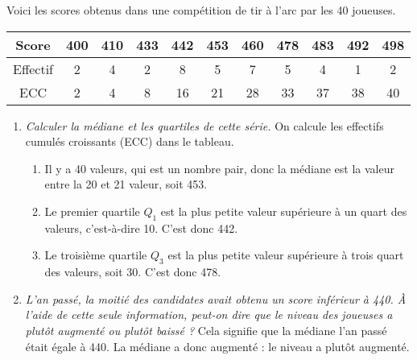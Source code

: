 \documentclass[12pt]{article}
\begin{document}
\begin{exercice}[Compétition]
  Voici les scores obtenus dans une compétition de tir à l'arc par
  les 40 joueuses.

  \begin{tabular}{c||c|c|c|c|c|c|c|c|c|c}
    Score
    & 400
    & 410
    & 433
    & 442
    & 453
    & 460
    & 478
    & 483
    & 492
    & 498
    \\
    \hline
    Effectif
    & 2
    & 4
    & 2
    & 8
    & 5
    & 7
    & 5
    & 4
    & 1
    & 2
    \\
    \hline
    ECC
    & 2
    & 4
    & 8
    & 16
    & 21
    & 28
    & 33
    & 37
    & 38
    & 40
  \end{tabular}

  \begin{enumerate}
    \item \emph{Calculer la médiane et les quartiles de cette série.}
      On calcule les effectifs cumulés croissants (ECC) dans le tableau.

      \begin{enumerate}
        \item Il y a 40 valeurs, qui est un nombre pair, donc la médiane est la valeur entre la 20 et 21 valeur, soit 453.
        \item Le premier quartile $Q_1$ est la plus petite valeur supérieure à un quart des valeurs, c'est-à-dire 10. C'est donc 442.
        \item Le troisième quartile $Q_3$ est la plus petite valeur supérieure à trois quart des valeurs, soit 30. C'est donc 478.
      \end{enumerate}
  \item \emph{L'an passé, la moitié des candidates avait obtenu un score inférieur à
    440. À l'aide de cette seule information, peut-on dire que le niveau des
  joueuses a plutôt augmenté ou plutôt baissé ?}
  Cela signifie que la médiane l'an passé était égale à 440. La médiane a donc augmenté : le niveau a plutôt augmenté.
  \end{enumerate}

\end{exercice}
\end{document}
